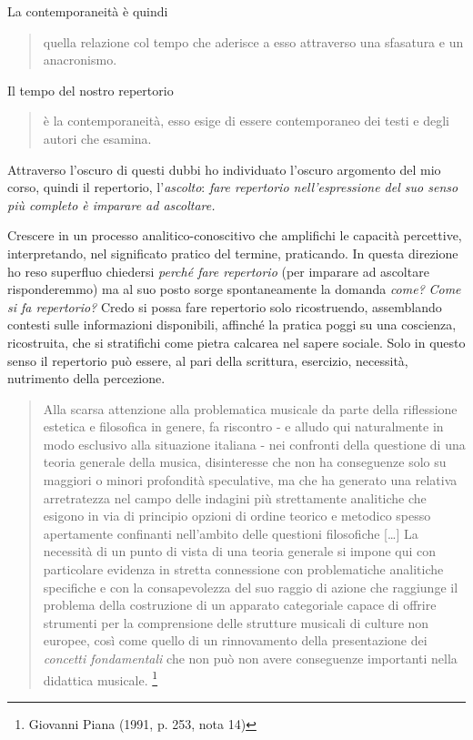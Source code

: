 La contemporaneità è quindi

\begin{quote}
	quella relazione col tempo che aderisce a esso attraverso una sfasatura e un anacronismo.
\end{quote}



Il tempo del nostro repertorio

\begin{quote}
	è la contemporaneità, esso esige di essere contemporaneo dei testi e degli autori che esamina.
\end{quote}



Attraverso l'oscuro di questi dubbi ho individuato l'oscuro argomento del mio corso, quindi il repertorio, l'\emph{ascolto}: \emph{fare repertorio nell'espressione del suo senso pi\`u completo \`e imparare ad ascoltare.}

Crescere in un processo analitico-conoscitivo che amplifichi le capacità percettive, interpretando, nel significato pratico del termine, praticando. In questa direzione ho reso superfluo chiedersi \emph{perché fare repertorio} (per imparare ad ascoltare risponderemmo) ma al suo posto sorge spontaneamente la domanda \emph{come?} \emph{Come si fa repertorio?} Credo si possa fare repertorio solo ricostruendo, assemblando contesti sulle informazioni disponibili, affinch\'e la pratica poggi su una coscienza, ricostruita, che si stratifichi come pietra calcarea nel sapere sociale. Solo in questo senso il repertorio può essere, al pari della scrittura, esercizio, necessità, nutrimento della percezione.

\begin{quote}
	Alla scarsa attenzione alla problematica musicale da parte della riflessione estetica e filosofica in genere, fa riscontro - e alludo qui naturalmente in modo esclusivo alla situazione italiana - nei confronti della questione di una teoria generale della musica, disinteresse che non ha conseguenze solo su maggiori o minori profondità speculative, ma che ha generato una relativa arretratezza nel campo delle indagini più strettamente analitiche che esigono in via di principio opzioni di ordine teorico e metodico spesso apertamente confinanti nell'ambito delle questioni filosofiche [\ldots] La necessità di un punto di vista di una teoria generale si impone qui con particolare evidenza in stretta connessione con problematiche analitiche specifiche e con la consapevolezza del suo raggio di azione che raggiunge il problema della costruzione di un apparato categoriale capace di offrire strumenti per la comprensione delle strutture musicali di culture non europee, così come quello di un  rinnovamento della presentazione dei \emph{concetti fondamentali} che non può non avere conseguenze importanti nella didattica musicale. \footnote{Giovanni Piana (1991, p. 253, nota 14)}
\end{quote}


